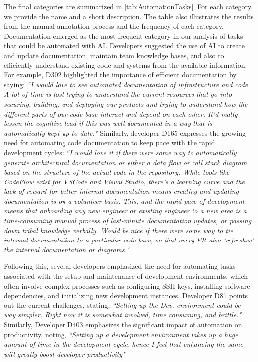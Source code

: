 The final categories are summarized in \cref{tab:AutomationTasks}. For each category, we provide the name and a short description.
The table also illustrates the results from the manual annotation process and the frequency of each category. 
Documentation emerged as the most frequent category in our analysis of tasks that could be automated with AI. Developers suggested the use of AI to create and update documentation, maintain team knowledge bases, and also to efficiently understand existing code and systems from the available information. For example, D302 highlighted the importance of efficient documentation by saying: \textit{``I would love to see automated documentation of infrastructure and code. A lot of time is lost trying to understand the current resources that go into securing, building, and deploying our products and trying to understand how the different parts of our code base interact and depend on each other. It'd really lessen the cognitive load if this was well-documented in a way that is automatically kept up-to-date."} Similarly, developer D165 expresses the growing need for automating code documentation to keep pace with the rapid development cycles: \textit{``I would love it if there were some way to automatically generate architectural documentation or either a data flow or call stack diagram based on the structure of the actual code in the repository. While tools like CodeFlow exist for VSCode and Visual Studio, there's a learning curve and the lack of reward for better internal documentation means creating and updating documentation is on a volunteer basis. This, and the rapid pace of development means that onboarding any new engineer or existing engineer to a new area is a time-consuming manual process of last-minute documentation updates, or passing down tribal knowledge verbally. Would be nice if there were some way to tie internal documentation to a particular code base, so that every PR also `refreshes' the internal documentation or diagrams."} 

Following this, several developers emphasized the need for automating tasks associated with the setup and maintenance of development environments, which often involve complex processes such as configuring SSH keys, installing software dependencies, and initializing new development instances. Developer D81 points out the current challenges, stating, \textit{``Setting up the Dev. environment could be way simpler. Right now it is somewhat involved, time consuming, and brittle."} 
Similarly, Developer D403 emphasizes the significant impact of automation on productivity, noting, \textit{``Setting up a development environment takes up a huge amount of time in the development cycle, hence I feel that enhancing the same will greatly boost developer productivity"}


